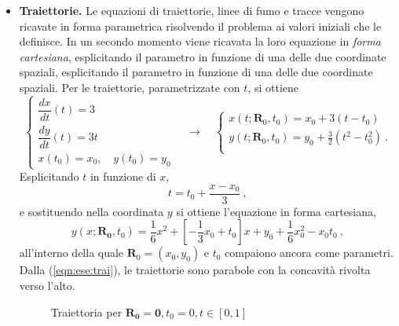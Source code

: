 \begin{itemize}
\item \textbf{Traiettorie.} Le equazioni di traiettorie, linee di fumo e tracce vengono ricavate in forma parametrica risolvendo il problema ai valori iniziali che le definisce. In un secondo momento viene ricavata la loro equazione in \textit{forma cartesiana}, esplicitando il parametro in funzione di una delle due coordinate spaziali, esplicitando il parametro in funzione di una delle due coordinate spaziali. Per le traiettorie, parametrizzate con $t$, si ottiene
\begin{equation}\label{eqn:ese:par}
 \begin{cases}
  \dfrac{dx}{dt}(t) = 3 \\
  \dfrac{dy}{dt}(t) = 3t \\
  x(t_0) = x_0 , \quad y(t_0) = y_0
 \end{cases}
 \quad \rightarrow \quad
 \begin{cases}
  x(t;\bm{R}_0,t_0) = x_0 + 3(t-t_0) \\
  y(t;\bm{R}_0,t_0) = y_0 +\frac{3}{2} (t^2 -t_0^2) \ . \\
 \end{cases}
\end{equation}
Esplicitando $t$ in funzione di $x$, 
\begin{equation}
 t = t_0 + \dfrac{x-x_0}{3} \ ,
\end{equation}
e sostituendo nella coordinata $y$ si ottiene l'equazione in forma cartesiana,
\begin{equation}\label{eqn:ese:trai}
 y(x;\bm{R_0},t_0) = \dfrac{1}{6}x^2 + \left[ -\dfrac{1}{3}x_0 +t_0 \right] x +
 y_0 + \dfrac{1}{6}x_0^2 - x_0 t_0 \ ,
\end{equation}
all'interno della quale $\bm{R}_0 = (x_0,y_0)$ e $t_0$ compaiono ancora come parametri. Dalla (\ref{eqn:ese:trai}), le traiettorie sono parabole con la concavità rivolta verso l'alto.


\begin{figure}[h!]
\centering
{}
\caption{Traiettoria per $\bm{R_0}=\bm{0} , t_0 = 0 , t \in [0,1]$}
\end{figure}



\end{itemize}
